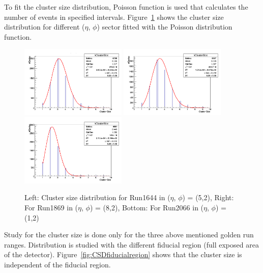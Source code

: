 To fit the cluster size distribution, Poisson function is used that calculates the number of events in specified intervals. Figure~\ref{fig:CSDpoissonfunction} shows the cluster size distribution for different ($\eta$, $\phi$) sector fitted with the Poisson distribution function.
\begin{figure}[!htbp]
    \centering
    \includegraphics[width=0.45\textwidth]{figures/GEM/Run1644.png}%
    \includegraphics[width=0.45\textwidth]{figures/GEM/Run1869.png}\\
    \includegraphics[width=0.45\textwidth]{figures/GEM/Run2066.png}
    \caption{Left: Cluster size distribution for Run1644 in ($\eta$, $\phi$) = (5,2), Right: For Run1869 in ($\eta$, $\phi$) = (8,2), Bottom: For Run2066 in ($\eta$, $\phi$) = (1,2)}
    \label{fig:CSDpoissonfunction}
\end{figure}
Study for the cluster size is done only for the three above mentioned golden run ranges. Distribution is studied with the different fiducial region (full exposed area of the detector). Figure~\ref{fig:CSDfiducialregion} shows that the cluster size is independent of the fiducial region.
